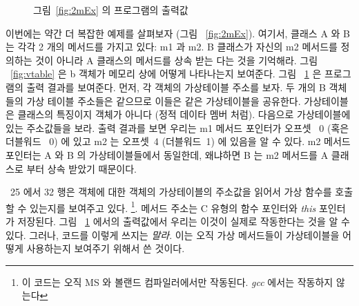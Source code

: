 \begin{figure}[tp]
\caption{그림~\ref{fig:2mEx} 의 프로그램의 출력값 \label{fig:2mExOut}}
\end{figure}

이번에는 약간 더 복잡한 예제를 살펴보자 (그림 ~\ref{fig:2mEx}). 여기서,
클래스 {\code A} 와 {\code B} 는 각각 2 개의 메서드를 가지고 있다:
{\code m1} 과 {\code m2}. {\code B} 클래스가 자신의 {\code m2} 메서드를
정의하는 것이 아니라 {\code A} 클래스의 메서드를 상속 받는 다는 것을 기억해라.
그림 ~\ref{fig:vtable} 은 {\code b} 객체가 메모리 상에 어떻게 나타나는지 보여준다.
그림 ~\ref{fig:2mExOut} 은 프로그램의 출력 결과를 보여준다. 먼저, 각 객체의 가상테이블 주소를
보자. 두 개의 {\code B} 객체들의 가상 테이블 주소들은 같으므로 이들은 같은 가상테이블을 공유한다. 가상테이블은
클래스의 특징이지 객체가 아니다 (정적 데이타 멤버 처럼). 다음으로 가상테이블에 있는 주소값들을 보라.
출력 결과를 보면 우리는 {\code m1} 메서드 포인터가 오프셋 ~0 (혹은 더블워드 ~0) 에 있고 
{\code m2} 는 오프셋~4 (더블워드~1) 에 있음을 알 수 있다. {\code m2} 메서드 포인터는 {\code A} 와
{\code B} 의 가상테이블들에서 동일한데, 왜냐하면 {\code B} 는 {\code m2} 메서드를 {\code A}
클래스로 부터 상속 받았기 때문이다. 

~25 에서 32 행은 객체에 대한 객체의 가상테이블의 주소값을 읽어서 가상 함수를 호출할 수 있는지를
보여주고 있다. \footnote{이 코드는 오직 MS 와 볼랜드 컴파일러에서만 작동된다. \emph{gcc} 에서는
작동하지 않는다}. 메서드 주소는 C 유형의 함수 포인터와 \emph{this} 포인터가 저장된다. 
그림 ~\ref{fig:2mExOut} 에서의 출력값에서 우리는 이것이 실제로 작동한다는 것을 알 수 있다.
그러나, 코드를 이렇게 쓰지는 \emph{말라}. 이는 오직 가상 메서드들이 가상테이블을 어떻게 사용하는지
보여주기 위해서 쓴 것이다. 

